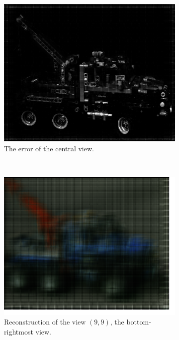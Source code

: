 \documentclass[11pt,a4paper,titlepage]{article}
\begin{document}
\begin{figure}[h]
\begin{subfigure}[t]{0.4\textwidth}
		\includegraphics[width=\textwidth]{results/legotruck_perspective_rec_3Layers_r=1/central_view_error.png}
		\caption{The error of the central view.}
	\end{subfigure}%
	\\
	\begin{subfigure}[t]{0.4\textwidth}
		\includegraphics[width=\textwidth]{results/legotruck_perspective_rec_3Layers_r=1/custom_view_reconstruction9-9.png}
		\caption{Reconstruction of the view $\left( 9, 9 \right)$, the bottom-rightmost view.}
	\end{subfigure}%
	~
	\begin{subfigure}[t]{0.4\textwidth}

\end{subfigure}
\end{figure}
\end{document}
